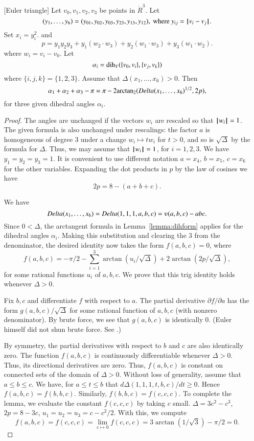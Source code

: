 \begin{lemma}[Euler triangle]\label{lemma:euler}
Let $v_0,v_1,v_2,v_3$ be points in $\ring{R}^3$. 
Let 
  $$(y_1,\ldots,y_6) =(y_{01},y_{02},y_{03},y_{23},y_{13},y_{12}),
   \text{ where } y_{ij}={\hskip0.1em|\hskip-0.15em|\hskip0.1em}v_i - v_j{\hskip0.1em|\hskip-0.15em|\hskip0.1em}.$$
Set
$x_i = y_i^2$.   
and
    $$
    p = y_1 y_2 y_3 + y_1 (w_2\cdot w_3) + y_2 (w_1\cdot w_3) + y_3
    (w_1\cdot w_2).
    $$
where $w_i = v_i- v_0$.
Let $$\alpha_i =\operatorname{dih}_V(\{v_0,v_i\},\{v_j,v_k\})$$
where $\{i,j,k\}=\{1,2,3\}$.
Assume that $\Delta(x_1,\ldots,x_6)>0$. 
Then
    $$
    \alpha_1+\alpha_2+\alpha_3 - \pi
     = {\pi} - 2{\operatorname{arctan_2}}({Delta(x_1,\ldots,x_6)^{1/2}},{2 p}),
    $$
for three given dihedral angles $\alpha_i$.
\end{lemma}

\begin{proof}
The angles are unchanged if the vectors $w_i$ are rescaled so that
${{\hskip0.1em|\hskip-0.15em|\hskip0.1em}w_i{\hskip0.1em|\hskip-0.15em|\hskip0.1em}}=1$.  The given formula is also unchanged under rescalings:
the factor $a$ is homogeneous of degree $3$ under a change $w_i
\mapsto t w_i$ for $t>0$, and so is $\sqrt{\Delta}$ by the
formula for $\Delta$.  Thus, we may assume that ${{\hskip0.1em|\hskip-0.15em|\hskip0.1em}w_i{\hskip0.1em|\hskip-0.15em|\hskip0.1em}}=1$, for
$i=1,2,3$. We have $y_1=y_2=y_3=1$.  It is convenient to use
different notation $a=x_4$, $b=x_5$, $c=x_6$ for the other
variables. Expanding the dot products in $p$ by the law of cosines
we have
    $$2 p = 8 - (a+b+c).$$

We have $$\Delta(x_1,\ldots,x_6) = \Delta(1,1,1,a,b,c) =
    \ups(a,b,c) - a b c.$$
Since $0 <\Delta$, the arctangent formula
in Lemma~\ref{lemma:dihform} 
applies for the dihedral angles $\alpha_i$. Making
this substitution and clearing the $3$ from the denominator, the
desired identity now takes the form $f(a,b,c)=0$, where
    $$
    f(a,b,c)= -\pi/2 - \sum_{i=1}^3\arctan(u_i/\sqrt{\Delta}) +
    2\arctan(2 p/\sqrt{\Delta}),
    $$
for some rational functions $u_i$ of $a,b,c$.  We prove that this
trig identity holds whenever $\Delta>0$.

Fix $b,c$ and differentiate $f$ with respect
to $a$.  The partial derivative $\partial f/\partial a$ has the form
$g(a,b,c)/\sqrt{\Delta}$ for some rational function of $a,b,c$ (with
nonzero denominator).  By brute force, we see that $g(a,b,c)$ is
identically $0$.  (Euler himself did not shun brute force.  See
\cite{Euler}.)

By symmetry, the partial derivatives with respect to $b$ and $c$ are
also identically zero.  The function $f(a,b,c)$  is continuously
differentiable whenever $\Delta>0$.  Thus, its directional
derivatives are zero.  Thus, $f(a,b,c)$ is constant on connected
sets of the domain of $\Delta>0$.  Without loss of generality,
assume that $a\le b\le c$.  We have, for $a\le t\le b$ that
$d\Delta(1,1,1,t,b,c)/dt\ge 0$. Hence $f(a,b,c)=f(b,b,c)$. 
Similarly,
 $f(b,b,c)=f(c,c,c)$. 
To complete the lemma, we evaluate the constant $f(c,c,c)$
by taking $c$ small.
$\Delta=3c^2-c^3$, $2p= 8-3c$,  $u_1=u_2=u_3 = c -c^2/2$. With this,
we compute
    $$f(a,b,c)= f(c,c,c) = \lim_{c\mapsto0} f(c,c,c) = 
    3 \arctan(1/\sqrt3)-\pi/2 =0.$$
\end{proof}
